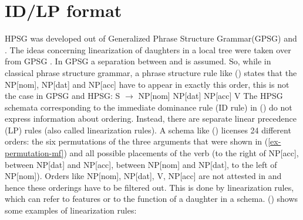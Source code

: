 \documentclass[output=paper]{langsci/langscibook}
\begin{document}
\section{ID/LP format}
\label{sec-id-lp}

HPSG was developed out of Generalized Phrase Structure Grammar\indexgpsg (GPSG) and . The ideas concerning linearization of
daughters in a local tree were taken over from GPSG \citep*{GKPS85a}. In GPSG a separation between
 and  is assumed. So, while in classical phrase structure
grammar, a phrase structure rule like () states that the NP[nom], NP[dat] and NP[acc] have to
appear in exactly this order, this is not the case in GPSG and HPSG:
\ea
\label{rule-s-np-np-np-v}
S $\to$ NP[nom] NP[dat] NP[acc] V
\z
The HPSG schemata corresponding to the immediate dominance rule (ID rule) in () do not express information
about ordering. Instead, there are separate linear precedence (LP) rules
(also called linearization rules). A schema like () licenses 24 
different orders: the six permutations of the three arguments that were shown in
(\ref{ex-permutation-mf}) and all possible placements of the verb (to the right of NP[acc], between
NP[dat] and NP[acc], between NP[nom] and NP[dat], to the left of NP[nom]). Orders like NP[nom],
NP[dat], V, NP[acc] are not attested in  and hence these orderings have to be filtered
out. This is done by linearization rules, which can refer to features or to the function of a
daughter in a schema. () shows some examples of linearization rules:
\end{document}
